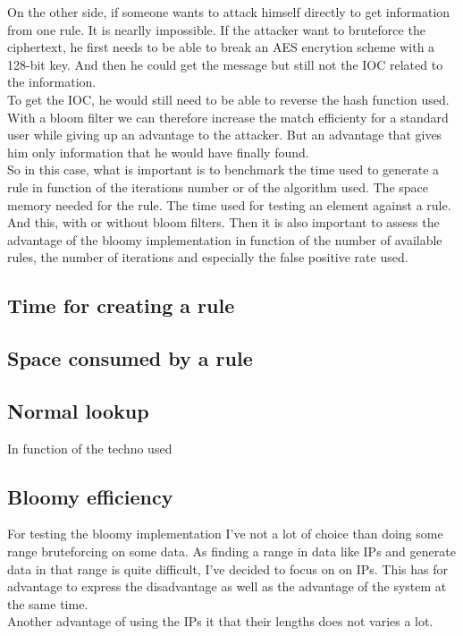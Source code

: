 \documentclass{eplmastersthesis}
\begin{document}
On the other side, if someone wants to attack himself directly to get information from one rule. It is nearlly impossible. If the attacker want to bruteforce the ciphertext, he first needs to be able to break an AES encrytion scheme with a 128-bit key. And then he could get the message but still not the IOC related to the information.\\
To get the IOC, he would still need to be able to reverse the hash function used.\\

With a bloom filter we can therefore increase the match efficienty for a standard user while giving up an advantage to the attacker. But an advantage that gives him only information that he would have finally found.\\

So in this case, what is important is to benchmark the time used to generate a rule in function of the iterations number or of the algorithm used. The space memory needed for the rule. The time used for testing an element against a rule.\\
And this, with or without bloom filters. Then it is also important to assess the advantage of the bloomy implementation in function of the number of available rules, the number of iterations and especially the false positive rate used.

\subsection{Time for creating a rule}

\subsection{Space consumed by a rule}

\subsection{Normal lookup}
In function of the techno used

\subsection{Bloomy efficiency}

For testing the bloomy implementation I've not a lot of choice than doing some range bruteforcing on some data.
As finding a range in data like IPs and generate data in that range is quite difficult, I've decided to focus on on IPs. This has for advantage to express the disadvantage as well as the advantage of the system at the same time.\\
Another advantage of using the IPs it that their lengths does not varies a lot.\\
\end{document}
